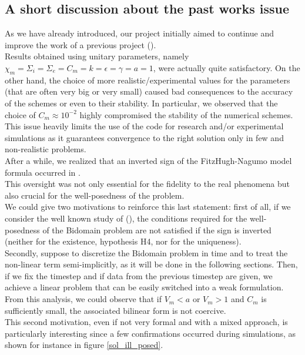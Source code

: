 \documentclass[a4paper,11pt]{article}
\begin{document}
    \subsection{A short discussion about the past works issue}
    As we have already introduced, our project initially aimed to continue and improve the work of a previous project (\parencite{marta}). \\
    Results obtained using unitary parameters, namely $\chi_m =\Sigma_i= \Sigma_e= C_m= k = \epsilon= \gamma= a=1$, were actually quite satisfactory. On the other hand, the choice of more realistic/experimental values for the parameters (that are often very big or very small) caused bad consequences to the accuracy of the schemes or even to their stability. In particular, we observed that the choice of $C_m \approx 10^{-2}$ highly compromised the stability of the numerical schemes.
    This issue heavily limits the use of the code for research and/or experimental simulations as it guarantees convergence to the right solution only in few and non-realistic problems.  \\

    \noindent After a while, we realized that an inverted sign of the FitzHugh-Nagumo model formula occurred in \cite{acta}. \\

    \noindent This oversight was not only essential for the fidelity to the real phenomena but also crucial for the well-posedness of the problem.\\ 
    We could give two motivations to reinforce this last statement: first of all, if we consider the well known study of \citeauthor{bourgault} (\cite{bourgault}), the conditions required for the well-posedness of the Bidomain problem are not satisfied if the sign is inverted (neither for the existence, hypothesis H4, nor for the uniqueness).\\ Secondly, suppose to discretize the Bidomain problem in time and to treat the non-linear term semi-implicitly, as it will be done in the following sections. Then, if we fix the timestep and if data from the previous timestep are given, we achieve a linear problem that can be easily switched into a weak formulation. From this analysis, we could observe that if $V_m<a$ or $V_m>1$ and $C_m$ is sufficiently small, the associated bilinear form is not coercive. \\

    \noindent This second motivation, even if not very formal and with a mixed approach, is particularly interesting since a few confirmations occurred during simulations, as shown for instance in figure \ref{sol_ill_posed}.
\end{document}
